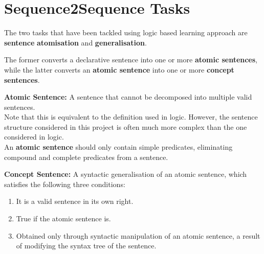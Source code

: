 
 
\section{Sequence2Sequence Tasks}
\label{sentence-type-definitions}

The two tasks that have been tackled using logic based learning approach are \textbf{sentence} \textbf{atomisation} and \textbf{generalisation}.

The former converts a declarative sentence into one or more \textbf{atomic sentences}, while the latter converts an \textbf{atomic sentence} into one or more \textbf{concept sentences}.

\textbf{Atomic Sentence:} A sentence that cannot be decomposed into multiple valid sentences. \\
Note that this is equivalent to the definition used in logic.
However, the sentence structure considered in this project is often much more complex than the one considered in logic.\\
An \textbf{atomic sentence} should only contain simple predicates, eliminating compound and complete predicates from a sentence.


\textbf{Concept Sentence:} A syntactic generalisation of an atomic sentence, which satisfies the following three conditions:
\begin{enumerate}
    \item It is a valid sentence in its own right.
    \item True if the atomic sentence is.
    \item Obtained only through syntactic manipulation of an atomic sentence, a result of modifying the syntax tree of the sentence.
\end{enumerate}

